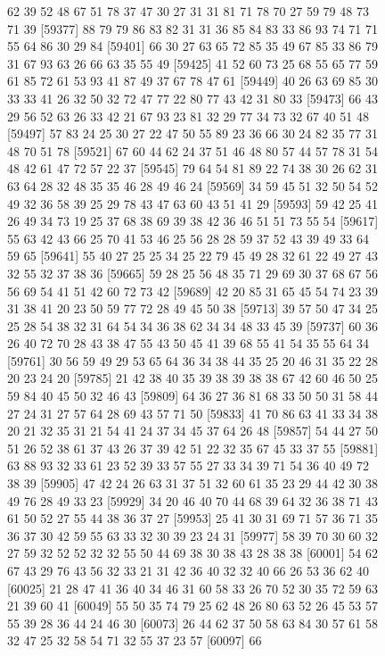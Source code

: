 \documentclass{article}
\begin{document}
\begin{figure}[H]
\begin{Schunk}
\begin{Soutput}
[59353] 62 39 52 48 67 51 78 37 47 30 27 31 31 81 71 78 70 27 59 79 48 73 71 39
[59377] 88 79 79 86 83 82 31 31 36 85 84 83 33 86 93 74 71 71 55 64 86 30 29 84
[59401] 66 30 27 63 65 72 85 35 49 67 85 33 86 79 31 67 93 63 26 66 63 35 55 49
[59425] 41 52 60 73 25 68 55 65 77 59 61 85 72 61 53 93 41 87 49 37 67 78 47 61
[59449] 40 26 63 69 85 30 33 33 41 26 32 50 32 72 47 77 22 80 77 43 42 31 80 33
[59473] 66 43 29 56 52 63 26 33 42 21 67 93 23 81 32 29 77 34 73 32 67 40 51 48
[59497] 57 83 24 25 30 27 22 47 50 55 89 23 36 66 30 24 82 35 77 31 48 70 51 78
[59521] 67 60 44 62 24 37 51 46 48 80 57 44 57 78 31 54 48 42 61 47 72 57 22 37
[59545] 79 64 54 81 89 22 74 38 30 26 62 31 63 64 28 32 48 35 35 46 28 49 46 24
[59569] 34 59 45 51 32 50 54 52 49 32 36 58 39 25 29 78 43 47 63 60 43 51 41 29
[59593] 59 42 25 41 26 49 34 73 19 25 37 68 38 69 39 38 42 36 46 51 51 73 55 54
[59617] 55 63 42 43 66 25 70 41 53 46 25 56 28 28 59 37 52 43 39 49 33 64 59 65
[59641] 55 40 27 25 25 34 25 22 79 45 49 28 32 61 22 49 27 43 32 55 32 37 38 36
[59665] 59 28 25 56 48 35 71 29 69 30 37 68 67 56 56 69 54 41 51 42 60 72 73 42
[59689] 42 20 85 31 65 45 54 74 23 39 31 38 41 20 23 50 59 77 72 28 49 45 50 38
[59713] 39 57 50 47 34 25 25 28 54 38 32 31 64 54 34 36 38 62 34 34 48 33 45 39
[59737] 60 36 26 40 72 70 28 43 38 47 55 43 50 45 41 39 68 55 41 54 35 55 64 34
[59761] 30 56 59 49 29 53 65 64 36 34 38 44 35 25 20 46 31 35 22 28 20 23 24 20
[59785] 21 42 38 40 35 39 38 39 38 38 67 42 60 46 50 25 59 84 40 45 50 32 46 43
[59809] 64 36 27 36 81 68 33 50 50 31 58 44 27 24 31 27 57 64 28 69 43 57 71 50
[59833] 41 70 86 63 41 33 34 38 20 21 32 35 31 21 54 41 24 37 34 45 37 64 26 48
[59857] 54 44 27 50 51 26 52 38 61 37 43 26 37 39 42 51 22 32 35 67 45 33 37 55
[59881] 63 88 93 32 33 61 23 52 39 33 57 55 27 33 34 39 71 54 36 40 49 72 38 39
[59905] 47 42 24 26 63 31 37 51 32 60 61 35 23 29 44 42 30 38 49 76 28 49 33 23
[59929] 34 20 46 40 70 44 68 39 64 32 36 38 71 43 61 50 52 27 55 44 38 36 37 27
[59953] 25 41 30 31 69 71 57 36 71 35 36 37 30 42 59 55 63 33 32 30 39 23 24 31
[59977] 58 39 70 30 60 32 27 59 32 52 52 32 32 55 50 44 69 38 30 38 43 28 38 38
[60001] 54 62 67 43 29 76 43 56 32 33 21 31 42 36 40 32 32 40 66 26 53 36 62 40
[60025] 21 28 47 41 36 40 34 46 31 60 58 33 26 70 52 30 35 72 59 63 21 39 60 41
[60049] 55 50 35 74 79 25 62 48 26 80 63 52 26 45 53 57 55 39 28 36 44 24 46 30
[60073] 26 44 62 37 50 58 63 84 30 57 61 58 32 47 25 32 58 54 71 32 55 37 23 57
[60097] 66
\end{Soutput}
\end{Schunk}

\end{figure}
\end{document}
